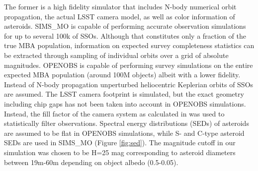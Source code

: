 The former is a high fidelity simulator that includes N-body numerical orbit propagation, the actual \gls{LSST} \gls{camera} model, as well as color information of asteroids. SIMS\_MO is capable of performing accurate observation simulations for up to several 100k of SSOs. Although that constitutes only a fraction of the true \gls{MBA} population, information on expected survey completeness statistics can be extracted through sampling of individual orbits over a grid of absolute magnitudes. 
OPENOBS is capable of performing survey simulations on the entire expected \gls{MBA} population (around 100M objects) albeit with a lower fidelity. Instead of N-body propagation unperturbed heliocentric Keplerian orbits of SSOs are assumed. The \gls{LSST} \gls{camera} \gls{footprint} is simulated, but the exact geometry including chip gaps has not been taken into account in OPENOBS simulations. Instead, the fill factor of the \gls{camera} system as calculated in \citet{veres2017high} was used to statistically filter observations. Spectral energy distributions (SEDs) of asteroids are assumed to be flat in OPENOBS simulations, while S- and C-type asteroid \gls{SED}s are used in SIMS\_MO (Figure \ref{fig:sed}). The magnitude cutoff in our simulation was chosen to be H=25 mag corresponding to asteroid diameters between 19m-60m depending on object albedo (0.5-0.05).
